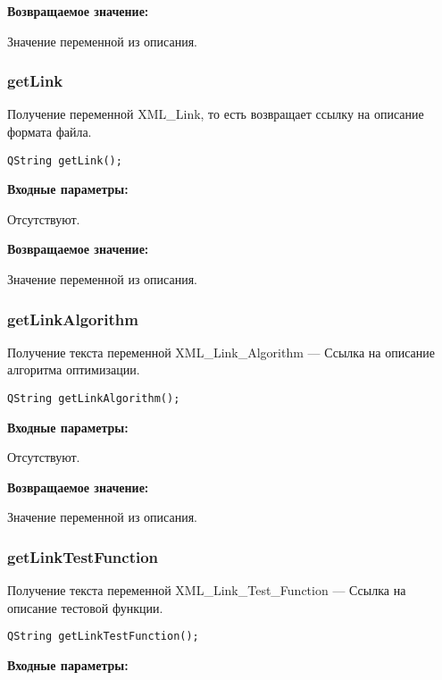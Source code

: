 \documentclass[a4paper,12pt]{article}
\begin{document}
\textbf{Возвращаемое значение:}

Значение переменной из описания.


\subsubsection{getLink}\label{getLink}

Получение переменной XML\_Link, то есть возвращает ссылку на описание формата файла.


\begin{lstlisting}[label=code_syntax_getLink,caption=Синтаксис]
QString getLink();
\end{lstlisting}

\textbf{Входные параметры:}

Отсутствуют.

\textbf{Возвращаемое значение:}

Значение переменной из описания.


\subsubsection{getLinkAlgorithm}\label{getLinkAlgorithm}

Получение текста переменной  XML\_Link\_Algorithm --- Ссылка на описание алгоритма оптимизации.


\begin{lstlisting}[label=code_syntax_getLinkAlgorithm,caption=Синтаксис]
QString getLinkAlgorithm();
\end{lstlisting}

\textbf{Входные параметры:}

Отсутствуют.

\textbf{Возвращаемое значение:}

Значение переменной из описания.


\subsubsection{getLinkTestFunction}\label{getLinkTestFunction}

Получение текста переменной  XML\_Link\_Test\_Function --- Ссылка на описание тестовой функции.


\begin{lstlisting}[label=code_syntax_getLinkTestFunction,caption=Синтаксис]
QString getLinkTestFunction();
\end{lstlisting}

\textbf{Входные параметры:}
\end{document}
